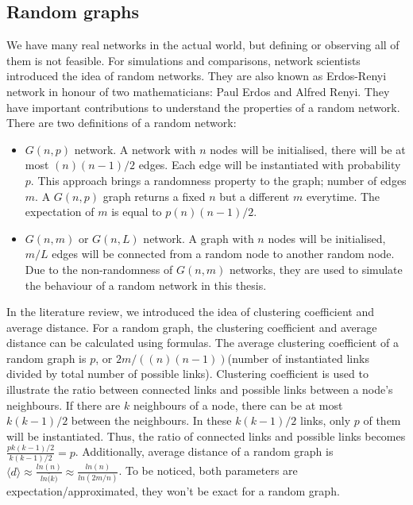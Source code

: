 \documentclass[12pt]{article}
\begin{document}
\subsection{Random graphs}
We have many real networks in the actual world, but defining or observing all of them is not feasible. For simulations and comparisons, network scientists introduced the idea of random networks. They are also known as Erdos-Renyi network in honour of two mathematicians: Paul Erdos and Alfred Renyi. They have important contributions to understand the properties of a random network\cite{barabási2016network}.\\
\noindent
There are two definitions of a random network:
\begin{itemize}
    \item $G(n,p)$ network. A network with $n$ nodes will be initialised, there will be at most $(n)(n-1)/2$ edges. Each edge will be instantiated with probability $p$. This approach brings a randomness property to the graph; number of edges $m$. A $G(n,p)$ graph returns a fixed $n$ but a different $m$ everytime. The expectation of $m$ is equal to $p(n)(n-1)/2$.
    \item $G(n,m)$ or $G(n,L)$ network. A graph with $n$ nodes will be initialised, $m/L$ edges will be connected from a random node to another random node. Due to the non-randomness of $G(n,m)$ networks, they are used to simulate the behaviour of a random network in this thesis.
\end{itemize}

\noindent
In the literature review, we introduced the idea of clustering coefficient and average distance. For a random graph, the clustering coefficient and average distance can be calculated using formulas.\cite{barabási2016network} The average clustering coefficient of a random graph is $p$, or $2m/((n)(n-1))$(number of instantiated links divided by total number of possible links). Clustering coefficient is used to illustrate the ratio between connected links and possible links between a node's neighbours. If there are $k$ neighbours of a node, there can be at most $k(k-1)/2$ between the neighbours. In these $k(k-1)/2$ links, only $p$ of them will be instantiated. Thus, the ratio of connected links and possible links becomes $\frac{pk(k-1)/2}{k(k-1)/2}=p$. Additionally, average distance of a random graph is $\langle d\rangle \approx \frac{ln(n)}{ln\bar (k)}\approx \frac{ln(n)}{ln(2m/n)}$. To be noticed, both parameters are expectation/approximated, they won't be exact for a random graph.
\end{document}
